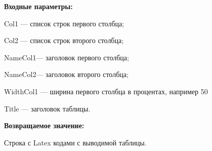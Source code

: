 \textbf{Входные параметры:}
 
    Col1 --- список строк первого столбца;
 
    Col2 --- список строк второго столбца;
 
    NameCol1--- заголовок первого столбца;
 
    NameCol2--- заголовок второго столбца;
 
    WidthCol1 --- ширина первого столбца в процентах, например 50%
 
    Title --- заголовок таблицы.

\textbf{Возвращаемое значение:}

Строка с Latex кодами с выводимой таблицы.